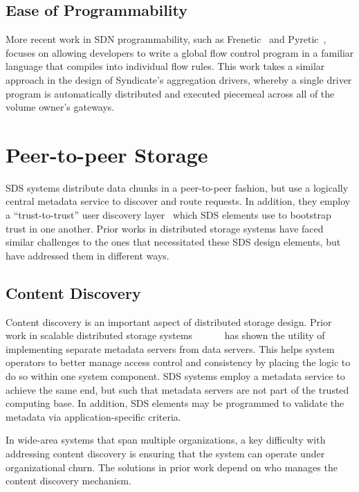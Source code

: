\subsection{Ease of Programmability}

More recent work in SDN programmability, such as Frenetic~\cite{frenetic} and
Pyretic~\cite{pyretic}, focuses on allowing developers to write a global flow
control program in a familiar language that compiles into individual flow rules.
This work takes a similar approach in the design of Syndicate's aggregation
drivers, whereby a single driver program is automatically distributed and
executed piecemeal across all of the volume owner's gateways.

\section{Peer-to-peer Storage}

SDS systems distribute data chunks in a peer-to-peer fashion, but use
a logically central metadata service to discover and route requests.  In
addition, they employ a ``trust-to-trust'' user discovery
layer~\cite{trust-to-trust-principle} which SDS elements use to bootstrap trust
in one another.  Prior works in distributed storage systems have faced similar
challenges to the ones that necessitated these SDS design elements, but have
addressed them in different ways.

\subsection{Content Discovery}

Content discovery is an important aspect of distributed storage design.
Prior work in scalable distributed storage
systems~\cite{berkeley-xFS}~\cite{farsite}~\cite{zebra}~\cite{spritefs}~\cite{glusterfs}~\cite{lustre}
has shown the utility of implementing separate metadata servers from data
servers.  This helps system operators to better manage access control and
consistency by placing the logic to do so within one system component.
SDS systems employ a metadata service to achieve the same end, but
such that metadata servers are not part of the trusted computing base.
In addition, SDS elements may be programmed to
validate the metadata via application-specific criteria.

In wide-area systems that span multiple organizations, a key difficulty with
addressing content discovery is ensuring that the system can operate under
organizational churn.  The solutions in prior work depend on who manages the content discovery
mechanism.

